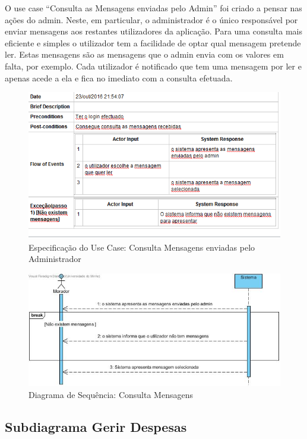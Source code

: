 O use case “Consulta as Mensagens enviadas pelo Admin” foi criado a pensar nas ações do admin. Neste, em particular, o administrador é o único responsável por enviar mensagens aos restantes utilizadores da aplicação. Para uma consulta mais eficiente e simples o utilizador tem a facilidade de optar qual mensagem pretende ler. Estas mensagens são as mensagens que o admin envia com os valores em falta, por exemplo. Cada utilizador é notificado que tem uma mensagem por ler e apenas acede a ela e fica no imediato com a consulta efetuada.

\begin{figure}[htb!]
	\centering
	\includegraphics[scale=0.6]{imagens/Especificacoes/consultasmsadmin}  
	\caption{Especificação do Use Case: Consulta Mensagens enviadas pelo Administrador}  
\end{figure}

\begin{figure}[htb!]
	\centering
	\includegraphics[scale=0.5]{imagens/diagramaSeq/ConsultarMensagensdoAdmin}  
	\caption{Diagrama de Sequência: Consulta Mensagens}  
\end{figure}

\newpage

\subsection{Subdiagrama Gerir Despesas}

